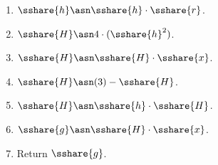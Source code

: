 \begin{enumerate}
\item $\sshare{h} \asn \sshare{h} \cdot \sshare{r}$.
\item $\sshare{H} \asn 4 \cdot (\sshare{h}^2)$.
\item $\sshare{H} \asn \sshare{H}\cdot \sshare{x}$.
\item $\sshare{H} \asn (3) - \sshare{H}$.
\item $\sshare{H} \asn \sshare{h} \cdot \sshare{H}$.
\item $\sshare{g} \asn \sshare{H} \cdot \sshare{x}$.
\item Return $\sshare{g}$.
\end{enumerate}

